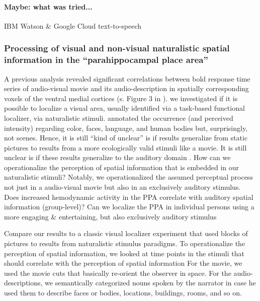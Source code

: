 \paragraph{Maybe: what was tried...}

IBM Watson \& Google Cloud text-to-speech


\subsubsection{Processing of visual and non-visual naturalistic spatial
information in the ``parahippocampal place area''}

%

%
A previous analysis \citep{hanke2016simultaneous} revealed significant
correlations between \ac{bold} response time series of audio-visual movie and
its audio-description in spatially corresponding voxels of the ventral medial
cortices (s. Figure 3 in \citep{hanke2016simultaneous}).
%
we investigated if it is possible to localize a visual area, usually
identified via a task-based functional localizer, via naturalistic stimuli.
%
\citep{bartels2004mapping} annotated the occurrence (and perceived intensity)
regarding color, faces, language, and human bodies but, surprisingly, not
scenes.
%
Hence, it is still ``kind of unclear'' is if results generalize from
static pictures to results from a more ecologically valid stimuli
like a movie.
%
It is still unclear is if these results generalize to the auditory domain
\citep{aziz2008modulation}.
%
How can we operationalize the perception of spatial information that is
embedded in our naturalistic stimuli?
%
Notably, we operationalized the assumed perceptual process not just in a
audio-visual movie but also in an exclusively auditory stimulus.
%
Does increased hemodynamic activity in the PPA correlate with auditory spatial
information (group-level)?
%
Can we localize the PPA in individual persons using a more engaging
\& entertaining, but also exclusively auditory stimulus

Compare our results to a classic visual localizer experiment that used blocks of
pictures to results from naturalistic stimulus paradigms.
%
To operationalize the perception of spatial information, we looked at time
points in the stimuli that should correlate with the perception of spatial
information
%
For the movie, we used the movie cuts that basically re-orient the observer in
space.
%
For the audio-descriptions, we semantically categorized nouns spoken by the
narrator in case he used them to describe faces or bodies, locations, buildings,
rooms, and so on.

